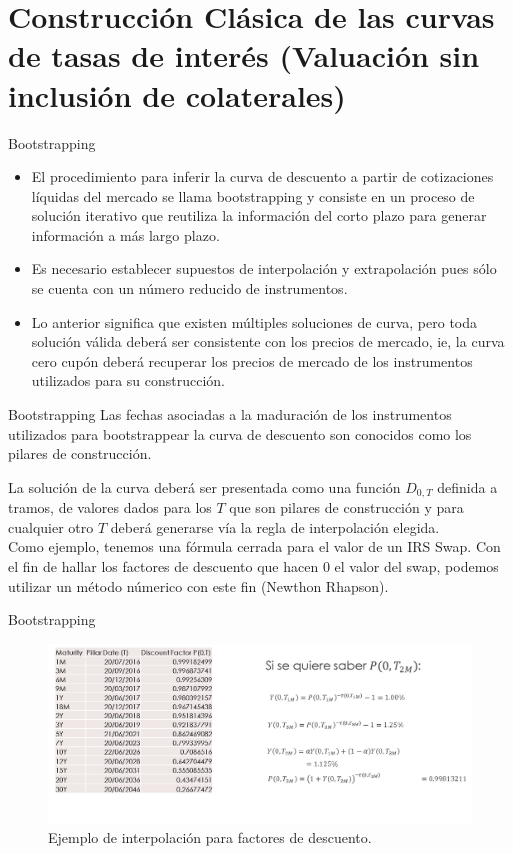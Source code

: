 \documentclass[11pt]{beamer}
\begin{document}
\section{Construcción Clásica de las curvas de tasas de interés (Valuación sin inclusión de colaterales)
}
\begin{frame}{Bootstrapping}
	\begin{itemize}
		\item El procedimiento para inferir la curva de descuento a partir de cotizaciones líquidas del mercado se llama bootstrapping y consiste en un proceso de solución iterativo que reutiliza la información del corto plazo para generar información a más largo plazo.
		\item Es necesario establecer supuestos de interpolación y extrapolación pues sólo se cuenta con un número reducido de instrumentos.
		\item 	Lo anterior significa que existen múltiples soluciones de curva, pero toda solución válida deberá ser consistente con los precios de mercado, ie, la curva cero cupón deberá recuperar los precios de mercado de los instrumentos utilizados para su construcción.
	\end{itemize}
	
\end{frame}
\begin{frame}{Bootstrapping}
	Las fechas asociadas a la maduración de los instrumentos utilizados para bootstrappear la curva de descuento son conocidos como los pilares de construcción. \medskip

	La solución de la curva deberá ser presentada como una función $D_{0,T}$ definida a tramos, de valores dados para los $T$ que son pilares de construcción y para cualquier otro $T$ deberá generarse vía la regla de interpolación elegida.\\

	Como ejemplo, tenemos una fórmula cerrada para el valor de un IRS Swap. Con el fin de hallar los factores de descuento que hacen $0$ el valor del swap, podemos utilizar un método númerico con este fin (Newthon Rhapson).
	
\end{frame}

\begin{frame}{Bootstrapping}
	\begin{figure}
		\centering
		\includegraphics[width=1\linewidth]{bootstrapinterp}
		\caption{Ejemplo de interpolación para factores de descuento.}
		\label{fig:bootstrapinterp}
	\end{figure}
	
\end{frame}
\end{document}
